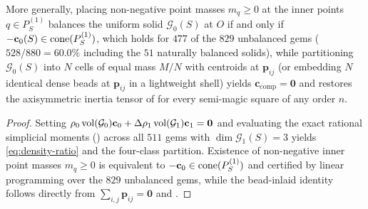 \begin{theorem}
More generally, placing non-negative point masses $m_q\ge0$ at the inner points $q\in P_S^{(1)}$ balances the uniform solid $\mathcal G_0(S)$ at $O$ if and only if $-\mathbf c_0(S)\in\operatorname{cone}(P_S^{(1)})$, which holds for $477$ of the $829$ unbalanced gems ($528/880=60.0\%$ including the $51$ naturally balanced solids), while partitioning $\mathcal G_0(S)$ into $N$ cells of equal mass $M/N$ with centroids at $\mathbf p_{ij}$ (or embedding $N$ identical dense beads at $\mathbf p_{ij}$ in a lightweight shell) yields $\mathbf c_{\mathrm{comp}}=\mathbf 0$ and restores the axisymmetric inertia tensor of  for every semi-magic square of any order $n$.
\end{theorem}

\begin{proof}
Setting $\rho_0\operatorname{vol}(\mathcal G_0)\mathbf c_0+\Delta\rho_1\operatorname{vol}(\mathcal G_1)\mathbf c_1=\mathbf 0$ and evaluating the exact rational simplicial moments () across all $511$ gems with $\dim\mathcal G_1(S)=3$ yields \eqref{eq:density-ratio} and the four-class partition. Existence of non-negative inner point masses $m_q\ge0$ is equivalent to $-\mathbf c_0\in\operatorname{cone}(P_S^{(1)})$ and certified by linear programming over the $829$ unbalanced gems, while the bead-inlaid identity follows directly from $\sum_{i,j}\mathbf p_{ij}=\mathbf 0$ and .
\end{proof}

